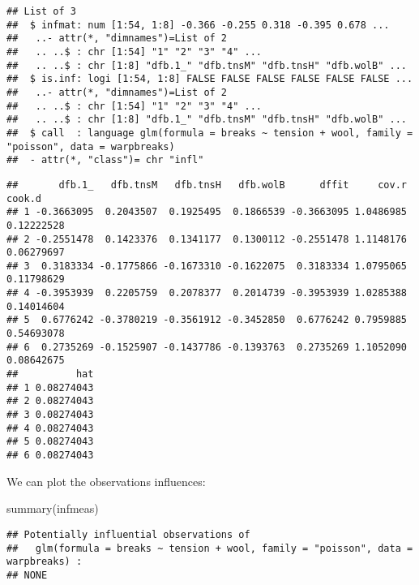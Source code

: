 \documentclass[
  oneside]{book}
\newenvironment{Shaded}{\begin{snugshade}}{\end{snugshade}}
\newcommand{\FunctionTok}[1]{\textcolor[rgb]{0.00,0.00,0.00}{#1}}
\newcommand{\NormalTok}[1]{#1}
\newcommand{\OtherTok}[1]{\textcolor[rgb]{0.56,0.35,0.01}{#1}}
\newcommand{\SpecialCharTok}[1]{\textcolor[rgb]{0.00,0.00,0.00}{#1}}
\begin{document}
\begin{verbatim}
## List of 3
##  $ infmat: num [1:54, 1:8] -0.366 -0.255 0.318 -0.395 0.678 ...
##   ..- attr(*, "dimnames")=List of 2
##   .. ..$ : chr [1:54] "1" "2" "3" "4" ...
##   .. ..$ : chr [1:8] "dfb.1_" "dfb.tnsM" "dfb.tnsH" "dfb.wolB" ...
##  $ is.inf: logi [1:54, 1:8] FALSE FALSE FALSE FALSE FALSE FALSE ...
##   ..- attr(*, "dimnames")=List of 2
##   .. ..$ : chr [1:54] "1" "2" "3" "4" ...
##   .. ..$ : chr [1:8] "dfb.1_" "dfb.tnsM" "dfb.tnsH" "dfb.wolB" ...
##  $ call  : language glm(formula = breaks ~ tension + wool, family = "poisson", data = warpbreaks)
##  - attr(*, "class")= chr "infl"
\end{verbatim}

\begin{Shaded}
\end{Shaded}

\begin{verbatim}
##       dfb.1_   dfb.tnsM   dfb.tnsH   dfb.wolB      dffit     cov.r     cook.d
## 1 -0.3663095  0.2043507  0.1925495  0.1866539 -0.3663095 1.0486985 0.12222528
## 2 -0.2551478  0.1423376  0.1341177  0.1300112 -0.2551478 1.1148176 0.06279697
## 3  0.3183334 -0.1775866 -0.1673310 -0.1622075  0.3183334 1.0795065 0.11798629
## 4 -0.3953939  0.2205759  0.2078377  0.2014739 -0.3953939 1.0285388 0.14014604
## 5  0.6776242 -0.3780219 -0.3561912 -0.3452850  0.6776242 0.7959885 0.54693078
## 6  0.2735269 -0.1525907 -0.1437786 -0.1393763  0.2735269 1.1052090 0.08642675
##          hat
## 1 0.08274043
## 2 0.08274043
## 3 0.08274043
## 4 0.08274043
## 5 0.08274043
## 6 0.08274043
\end{verbatim}

We can plot the observations influences:

\begin{Shaded}
\begin{Highlighting}[]
\FunctionTok{summary}\NormalTok{(infmeas)}
\end{Highlighting}
\end{Shaded}

\begin{verbatim}
## Potentially influential observations of
##   glm(formula = breaks ~ tension + wool, family = "poisson", data = warpbreaks) :
## NONE
\end{verbatim}
\end{document}
